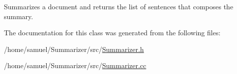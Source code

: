 Summarizes a document and returns the list of sentences that composes the summary. 



The documentation for this class was generated from the following files\+:\begin{DoxyCompactItemize}
\item 
/home/samuel/\+Summarizer/src/\hyperlink{Summarizer_8h}{Summarizer.\+h}\item 
/home/samuel/\+Summarizer/src/\hyperlink{Summarizer_8cc}{Summarizer.\+cc}\end{DoxyCompactItemize}
